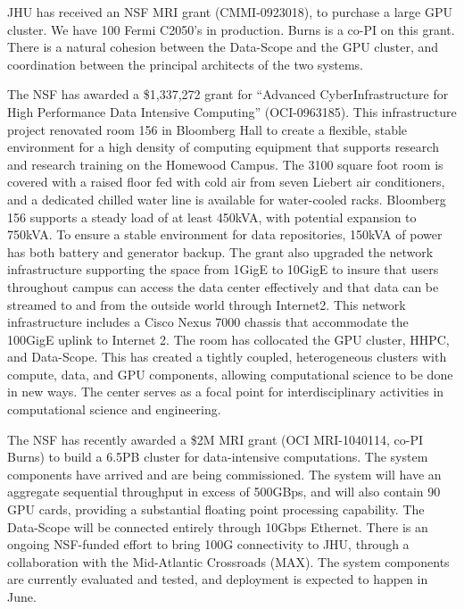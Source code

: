 % 
JHU has received an NSF MRI grant (CMMI-0923018), to purchase a large GPU cluster. We have 100 Fermi C2050's in production. Burns is a co-PI on this grant. There is a natural cohesion between the Data-Scope and the GPU cluster, and coordination between the principal architects of the two systems.


% 
The NSF has awarded a \$1,337,272 grant for ``Advanced CyberInfrastructure for High Performance Data Intensive Computing'' (OCI-0963185). This infrastructure project renovated room 156 in Bloomberg Hall to create a flexible, stable environment for a high density of computing equipment that supports research and research training on the Homewood Campus. The 3100 square foot room is covered with a raised floor fed with cold air from seven Liebert air conditioners, and a dedicated chilled water line is available for water-cooled racks. Bloomberg 156 supports a steady load of at least 450kVA, with potential expansion to 750kVA. To ensure a stable environment for data repositories, 150kVA of power has both battery and generator backup. The grant also upgraded the network infrastructure supporting the space from 1GigE to 10GigE to insure that users throughout campus can access the data center effectively and that data can be streamed to and from the outside world through Internet2.  This network infrastructure includes a Cisco Nexus 7000 chassis that accommodate the 100GigE uplink to Internet 2. The room has collocated the GPU cluster, HHPC, and Data-Scope. This has created a tightly coupled, heterogeneous clusters with compute, data, and GPU components, allowing computational science to be done in new ways. The center serves as a focal point for interdisciplinary activities in computational science and engineering. 


The NSF has recently awarded a \$2M MRI grant (OCI MRI-1040114, co-PI Burns) to build a 6.5PB cluster for data-intensive computations. The system components have arrived and are being commissioned. The system will have an aggregate sequential throughput in excess of 500GBps, and will also contain 90 GPU cards, providing a substantial floating point processing capability. The Data-Scope will be connected entirely through 10Gbps Ethernet. There is an ongoing NSF-funded effort to bring 100G connectivity to JHU, through a collaboration with the Mid-Atlantic Crossroads (MAX). The system components are currently evaluated and tested, and deployment is expected to happen in June.

